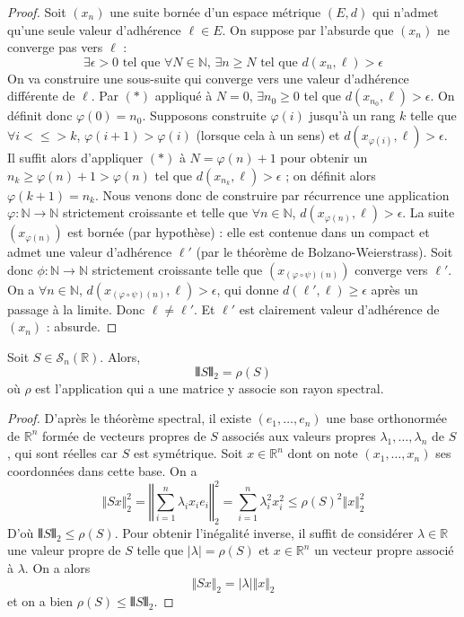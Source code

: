   \begin{proof}
    Soit $(x_n)$ une suite bornée d'un espace métrique $(E, d)$ qui n'admet qu'une seule valeur d'adhérence $\ell \in E$. On suppose par l'absurde que $(x_n)$ ne converge pas vers $\ell$ :
    \[ \exists \epsilon > 0 \text{ tel que } \forall N \in \mathbb{N}, \, \exists n \geq N \text{ tel que } d(x_n, \ell) > \epsilon \tag{$*$} \]
    On va construire une sous-suite qui converge vers une valeur d'adhérence différente de $\ell$.
    \newpar
    Par $(*)$ appliqué à $N = 0$, $\exists n_0 \geq 0$ tel que $d(x_{n_0}, \ell) > \epsilon$. On définit donc $\varphi(0) = n_0$.
    \newpar
    Supposons construite $\varphi(i)$ jusqu'à un rang $k$ telle que $\forall i <\leq> k$, $\varphi(i+1) > \varphi(i)$ (lorsque cela à un sens) et $d(x_{\varphi(i)}, \ell) > \epsilon$. Il suffit alors d'appliquer $(*)$ à $N = \varphi(n) + 1$ pour obtenir un $n_k \geq \varphi(n) + 1 > \varphi(n)$ tel que $d(x_{n_k}, \ell) > \epsilon$ ; on définit alors $\varphi(k+1) = n_k$.
    \newpar
    Nous venons donc de construire par récurrence une application $\varphi : \mathbb{N} \rightarrow \mathbb{N}$ strictement croissante et telle que $\forall n \in \mathbb{N}$, $d(x_{\varphi(n)}, \ell) > \epsilon$. La suite $(x_{\varphi(n)})$ est bornée (par hypothèse) : elle est contenue dans un compact et admet une valeur d'adhérence $\ell'$ (par le théorème de Bolzano-Weierstrass). Soit donc $\phi : \mathbb{N} \rightarrow \mathbb{N}$ strictement croissante telle que $(x_{(\varphi \circ \psi)(n)})$ converge vers $\ell'$.
    \newpar
    On a $\forall n \in \mathbb{N}$, $d(x_{(\varphi \circ \psi)(n)}, \ell) > \epsilon$, qui donne $d(\ell', \ell) \geq \epsilon$ après un passage à la limite. Donc $\ell \neq \ell'$.  Et $\ell'$ est clairement valeur d'adhérence de $(x_n)$ : absurde.
  \end{proof}


  \begin{lemma}
    \label{homeomorphisme-de-l-exponentielle-3}
    Soit $S \in \mathcal{S}_n(\mathbb{R})$. Alors,
    \[ \VERT S \VERT_2 = \rho(S) \]
    où $\rho$ est l'application qui a une matrice y associe son rayon spectral.
  \end{lemma}

  \begin{proof}
    D'après le théorème spectral, il existe $(e_1, \dots, e_n)$ une base orthonormée de $\mathbb{R}^n$ formée de vecteurs propres de $S$ associés aux valeurs propres $\lambda_1, \dots, \lambda_n$ de $S$, qui sont réelles car $S$ est symétrique. Soit $x \in \mathbb{R}^n$ dont on note $(x_1, \dots, x_n)$ ses coordonnées dans cette base. On a
    \[ \Vert Sx \Vert_2^2 = \left \Vert \sum_{i=1}^{n} \lambda_i x_i e_i \right \Vert_2^2 = \sum_{i=1}^n \lambda_i^2 x_i^2 \leq \rho(S)^2 \Vert x \Vert_2^2 \]
    D'où $\VERT S \VERT_2 \leq \rho(S)$. Pour obtenir l'inégalité inverse, il suffit de considérer $\lambda \in \mathbb{R}$ une valeur propre de $S$ telle que $|\lambda| = \rho(S)$ et $x \in \mathbb{R}^n$ un vecteur propre associé à $\lambda$. On a alors
    \[ \Vert Sx \Vert_2 = |\lambda| \Vert x \Vert_2 \]
    et on a bien $\rho(S) \leq \VERT S \VERT_2$.
  \end{proof}

